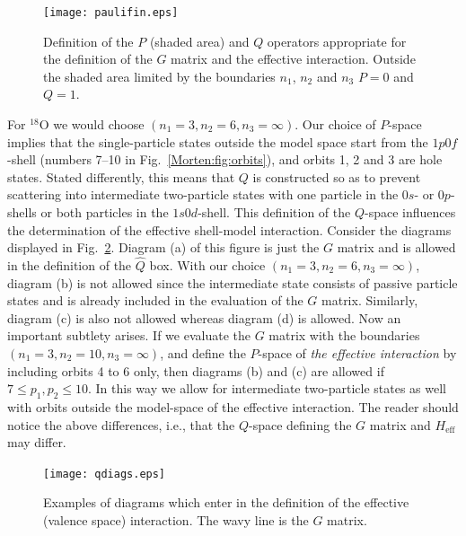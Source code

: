 \begin{figure}%
	\begin{center}
      	\texttt{[image: paulifin.eps]}
	\end{center}
\caption{Definition of the $P$ (shaded area) and $Q$ operators
appropriate for the definition of the $G$ matrix and the effective
interaction. Outside the shaded area limited by the boundaries $n_1$,
$n_2$ and $n_3$ $P=0$ and $Q=1$.}
\label{Morten:fig:qoperat}
\end{figure}


For $^{18}$O we would choose $(n_1=3,n_2=6,n_3=\infty)$. 
Our choice of 
$P$-space implies that the single-particle states outside the model space
start from the
$1p0f$-shell (numbers 7--10 in Fig.~\ref{Morten:fig:orbits}), and orbits 1, 2
and 3 are hole states. Stated differently, this means that $Q$
is constructed so as to prevent scattering into intermediate 
two-particle states 
with one particle in the $0s$- or $0p$-shells or both particles
in the $1s0d$-shell. This definition of the $Q$-space influences the determination
of the effective shell-model interaction. Consider the diagrams displayed
in Fig.~\ref{Morten:fig:qboxexam1}.
Diagram (a) of this figure is just the $G$ matrix and is allowed in the definition
of the $\hat{Q}$ box. With our choice $(n_1=3,n_2=6,n_3=\infty)$, diagram (b) is not
allowed since the intermediate state consists of passive particle
states  and is already included in the evaluation of the $G$ matrix. Similarly,
diagram (c) is also not allowed whereas diagram (d) is allowed. Now an important
subtlety arises. If we evaluate the $G$ matrix with the boundaries
$(n_1=3,n_2=10,n_3=\infty)$, and define the $P$-space of {\em 
the effective interaction}
by including orbits 4 to 6 only, then diagrams (b) and (c)
are allowed if $7\leq p_1 , p_2 \leq 10$.
In this way we allow for 
intermediate two-particle states as well with orbits outside the 
model-space of the effective interaction. The reader should notice the above
differences, i.e., that the $Q$-space defining the $G$ matrix and 
$H_{\mathrm{eff}}$
may differ. 
\begin{figure}%
	\begin{center}
      	\texttt{[image: qdiags.eps]}
	\end{center}
\caption{Examples of diagrams which enter in the definition of  the effective 
(valence space) interaction. The wavy line is the $G$ matrix.}
\label{Morten:fig:qboxexam1}
\end{figure}


